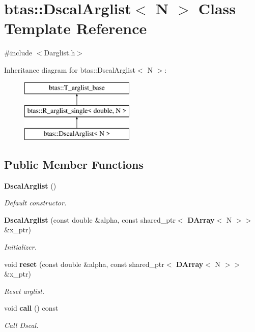 \section{btas\-:\-:Dscal\-Arglist$<$ N $>$ Class Template Reference}
\label{d0/d2f/classbtas_1_1DscalArglist}


{\ttfamily \#include $<$Darglist.\-h$>$}

Inheritance diagram for btas\-:\-:Dscal\-Arglist$<$ N $>$\-:\begin{figure}[H]
\begin{center}
\leavevmode
\includegraphics[height=3.000000cm]{d0/d2f/classbtas_1_1DscalArglist}
\end{center}
\end{figure}
\subsection*{Public Member Functions}
\begin{DoxyCompactItemize}
\item 
{\bf Dscal\-Arglist} ()
\begin{DoxyCompactList}\small\item\em Default constructor. \end{DoxyCompactList}\item 
{\bf Dscal\-Arglist} (const double \&alpha, const shared\-\_\-ptr$<$ {\bf D\-Array}$<$ N $>$$>$ \&x\-\_\-ptr)
\begin{DoxyCompactList}\small\item\em Initializer. \end{DoxyCompactList}\item 
void {\bf reset} (const double \&alpha, const shared\-\_\-ptr$<$ {\bf D\-Array}$<$ N $>$$>$ \&x\-\_\-ptr)
\begin{DoxyCompactList}\small\item\em Reset arglist. \end{DoxyCompactList}\item 
void {\bf call} () const 
\begin{DoxyCompactList}\small\item\em Call Dscal. \end{DoxyCompactList}\end{DoxyCompactItemize}
